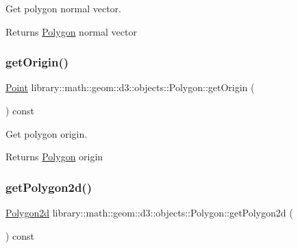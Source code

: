 Get polygon normal vector. 

\begin{DoxyReturn}{Returns}
\hyperlink{classlibrary_1_1math_1_1geom_1_1d3_1_1objects_1_1_polygon}{Polygon} normal vector 
\end{DoxyReturn}
\mbox{\label{classlibrary_1_1math_1_1geom_1_1d3_1_1objects_1_1_polygon_add4c768333dd8a58e700b84c67ab1df1}} 
\subsubsection{\texorpdfstring{get\+Origin()}{getOrigin()}}
{\footnotesize\ttfamily \hyperlink{classlibrary_1_1math_1_1geom_1_1d3_1_1objects_1_1_point}{Point} library\+::math\+::geom\+::d3\+::objects\+::\+Polygon\+::get\+Origin (\begin{DoxyParamCaption}{ }\end{DoxyParamCaption}) const}



Get polygon origin. 

\begin{DoxyReturn}{Returns}
\hyperlink{classlibrary_1_1math_1_1geom_1_1d3_1_1objects_1_1_polygon}{Polygon} origin 
\end{DoxyReturn}
\mbox{\label{classlibrary_1_1math_1_1geom_1_1d3_1_1objects_1_1_polygon_a52a2a342758ed8570aecefa1a18311ec}} 
\subsubsection{\texorpdfstring{get\+Polygon2d()}{getPolygon2d()}}
{\footnotesize\ttfamily \hyperlink{namespacelibrary_1_1math_1_1geom_1_1d3_1_1objects_ae339035ccf9a6f4f0d2945fdcfd76f95}{Polygon2d} library\+::math\+::geom\+::d3\+::objects\+::\+Polygon\+::get\+Polygon2d (\begin{DoxyParamCaption}{ }\end{DoxyParamCaption}) const}



